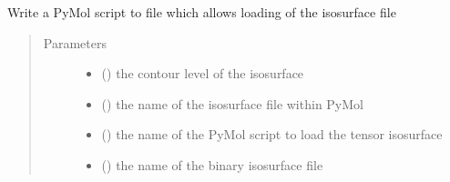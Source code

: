 \documentclass[a4paper,10pt,english,openany,oneside]{sphinxmanual}
\begin{document}
\begin{fulllineitems}
\begin{fulllineitems}
\begin{fulllineitems}
\label{\detokenize{reference/generated/paramagpy.metal.Metal.write_pymol_script:paramagpy.metal.Metal.write_pymol_script}}
\sphinxAtStartPar
Write a PyMol script to file which allows loading of the
isosurface file
\begin{quote}\begin{description}
\item[{Parameters}] \leavevmode\begin{itemize}
\item {} 
\sphinxAtStartPar
{} (\sphinxstyleliteralemphasis{\sphinxupquote{ (}}\sphinxstyleliteralemphasis{\sphinxupquote{)}}) \textendash{} the contour level of the isosurface

\item {} 
\sphinxAtStartPar
{} (\sphinxstyleliteralemphasis{\sphinxupquote{ (}}\sphinxstyleliteralemphasis{\sphinxupquote{)}}) \textendash{} the name of the isosurface file within PyMol

\item {} 
\sphinxAtStartPar
{} (\sphinxstyleliteralemphasis{\sphinxupquote{ (}}\sphinxstyleliteralemphasis{\sphinxupquote{)}}) \textendash{} the name of the PyMol script to load the tensor isosurface

\item {} 
\sphinxAtStartPar
{} (\sphinxstyleliteralemphasis{\sphinxupquote{ (}}\sphinxstyleliteralemphasis{\sphinxupquote{)}}) \textendash{} the name of the binary isosurface file


\end{itemize}
\end{description}
\end{quote}
\end{fulllineitems}
\end{fulllineitems}
\end{fulllineitems}
\end{document}

